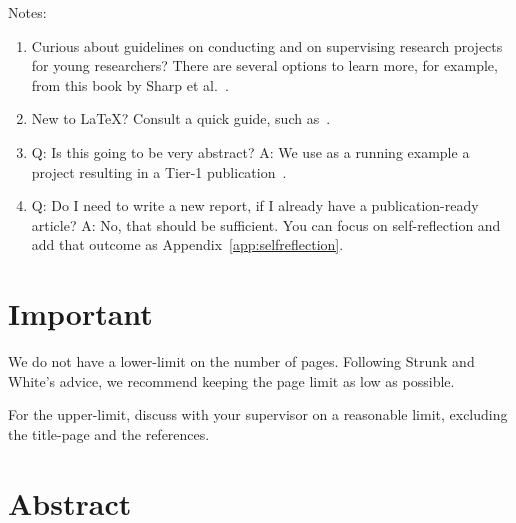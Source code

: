 \documentclass[11pt]{article}
\begin{document}
\newpage

Notes:
\begin{enumerate}

    \item Curious about guidelines on conducting and on supervising research projects for young researchers? %
    There are several options to learn more, for example, from this book by Sharp et al.~\cite{research:book/SharpPW02}.

    \item New to \LaTeX{}? Consult a quick guide, such as~\cite{techrep:latex,techblog:latex}.
    
    \item Q: Is this going to be very abstract? A: We use as a running example a project resulting in a Tier-1 publication~\cite{DBLP:conf/sc/AndreadisVMI18}. 
    
    \item Q: Do I need to write a new report, if I already have a publication-ready article? A: No, that should be sufficient. You can focus on self-reflection and add that outcome as Appendix~\ref{app:selfreflection}.
    
\end{enumerate}


\section*{Important}

We do not have a lower-limit on the number of pages. Following Strunk and White's advice, we recommend keeping the page limit as low as possible. \cite{DBLP:conf/sc/AndreadisVMI18}

For the upper-limit, discuss with your supervisor on a reasonable limit, excluding the title-page and the references.




\section*{Abstract}
\end{document}
